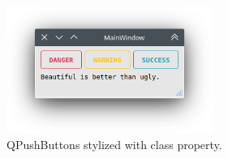 \begin{figure}[H]
\begin{centering}
% 
\includegraphics[width=0.6\textwidth]{Appendix/python_modules/Figures/qt-extra.png}
\par\end{centering}
\caption{QPushButtons stylized with class property.}
\label{fig:qt-extra}
\end{figure}